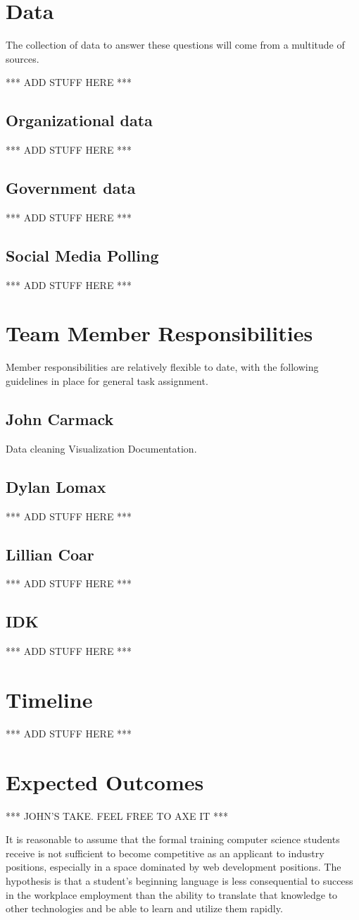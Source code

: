 \documentclass[letterpaper, 10 pt, conference]{ieeeconf}  %
\begin{document}
\section{Data}

The collection of data to answer these questions will come from a multitude of sources. 

*** ADD STUFF HERE ***
\subsection{Organizational data}
*** ADD STUFF HERE ***
\subsection{Government data}
*** ADD STUFF HERE ***
\subsection{Social Media Polling}
*** ADD STUFF HERE ***

\section{Team Member Responsibilities}
Member responsibilities are relatively flexible to date, with the following guidelines in place for general task assignment. 

\subsection{John Carmack}
Data cleaning
Visualization
Documentation.

\subsection{Dylan Lomax}
*** ADD STUFF HERE ***
\subsection{Lillian Coar}
*** ADD STUFF HERE ***
\subsection{IDK}
*** ADD STUFF HERE ***
 
\section{Timeline}
*** ADD STUFF HERE ***

\section{Expected Outcomes}

*** JOHN'S TAKE. FEEL FREE TO AXE IT *** 

It is reasonable to assume that the formal training computer science students receive is not sufficient to become competitive as an applicant to industry positions, especially in a space dominated by web development positions. The hypothesis is that a student's beginning language is less consequential to success in the workplace employment than the ability to translate that knowledge to other technologies and be able to learn and utilize them rapidly. 
\end{document}
